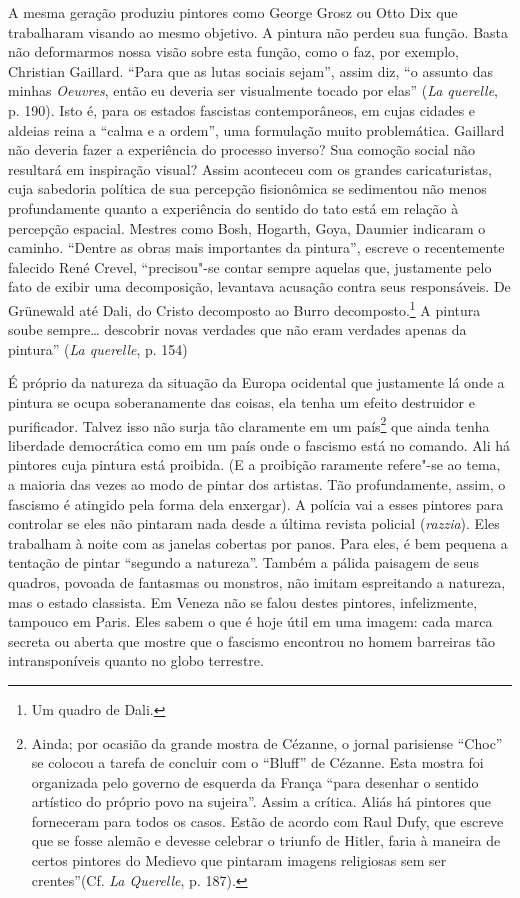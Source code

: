 A mesma geração produziu pintores como George Grosz ou Otto Dix que
trabalharam visando ao mesmo objetivo. A pintura não perdeu sua função.
Basta não deformarmos nossa visão sobre esta função, como o faz, por
exemplo, Christian Gaillard. ``Para que as lutas sociais sejam'', assim
diz, ``o assunto das minhas \emph{Oeuvres}, então eu deveria ser
visualmente tocado por elas'' (\emph{La querelle}, p. 190). Isto é, para
os estados fascistas contemporâneos, em cujas cidades e aldeias reina a
``calma e a ordem'', uma formulação muito problemática. Gaillard não
deveria fazer a experiência do processo inverso? Sua comoção social não
resultará em inspiração visual? Assim aconteceu com os grandes
caricaturistas, cuja sabedoria política de sua percepção fisionômica se
sedimentou não menos profundamente quanto a experiência do sentido do
tato está em relação à percepção espacial. Mestres como Bosh, Hogarth,
Goya, Daumier indicaram o caminho. ``Dentre as obras mais importantes da
pintura'', escreve o recentemente falecido René Crevel, ``precisou"-se
contar sempre aquelas que, justamente pelo fato de exibir uma
decomposição, levantava acusação contra seus responsáveis. De Grünewald
até Dali, do Cristo decomposto ao Burro decomposto.\footnote{Um quadro de
  Dali.} A pintura soube sempre\ldots{} descobrir novas verdades que não
eram verdades apenas da pintura'' (\emph{La querelle}, p. 154)

É próprio da natureza da situação da Europa ocidental que justamente lá
onde a pintura se ocupa soberanamente das coisas, ela tenha um efeito
destruidor e purificador. Talvez isso não surja tão claramente em um
país\footnote{Ainda; por ocasião da grande mostra de Cézanne, o jornal
  parisiense ``Choc'' se colocou a tarefa de concluir com o ``Bluff'' de
  Cézanne. Esta mostra foi organizada pelo governo de esquerda da França
  ``para desenhar o sentido artístico do próprio povo na sujeira''.
  Assim a crítica. Aliás há pintores que forneceram para todos os casos.
  Estão de acordo com Raul Dufy, que escreve que se fosse alemão e
  devesse celebrar o triunfo de Hitler, faria à maneira de certos
  pintores do Medievo que pintaram imagens religiosas sem ser
  crentes''(Cf. \emph{La Querelle}, p. 187).} que ainda tenha liberdade
democrática como em um país onde o fascismo está no comando. Ali há
pintores cuja pintura está proibida. (E a proibição raramente refere"-se
ao tema, a maioria das vezes ao modo de pintar dos artistas. Tão
profundamente, assim, o fascismo é atingido pela forma dela enxergar). A
polícia vai a esses pintores para controlar se eles não pintaram nada
desde a última revista policial (\emph{razzia}). Eles trabalham à noite
com as janelas cobertas por panos. Para eles, é bem pequena a tentação
de pintar ``segundo a natureza''. Também a pálida paisagem de seus
quadros, povoada de fantasmas ou monstros, não imitam espreitando a
natureza, mas o estado classista. Em Veneza não se falou destes
pintores, infelizmente, tampouco em Paris. Eles sabem o que é hoje útil
em uma imagem: cada marca secreta ou aberta que mostre que o fascismo
encontrou no homem barreiras tão intransponíveis quanto no globo
terrestre.
